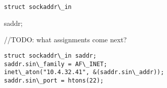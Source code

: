 \documentclass{article}[9pt]
\newenvironment{myanswer}{\begin{mdframed}\begin{answerfont}}{\end{answerfont}\end{mdframed}}
\begin{document}
\begin{enumerate}
\begin{lstlisting}
struct sockaddr\_in
\end{lstlisting}
 saddr;

//TODO: what assignments come next?


\begin{myanswer}
\begin{lstlisting}
struct sockaddr\_in saddr;
saddr.sin\_family = AF\_INET;
inet\_aton("10.4.32.41", &(saddr.sin\_addr));
saddr.sin\_port = htons(22);

\end{lstlisting}
\end{myanswer}

\end{enumerate}
\end{document}
